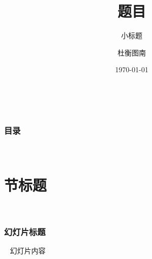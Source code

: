 \documentclass{beamer}
\title{题目}
\subtitle{小标题}
\author{杜衡图南}
\institute{学校名称}
\date{\today}
\begin{document}
\frame{\titlepage}
\begin{frame}
  \frametitle{目录}
  \tableofcontents
\end{frame}
\section{节标题}
\begin{frame}
  \frametitle{幻灯片标题}
  幻灯片内容
\end{frame}
\end{document}
